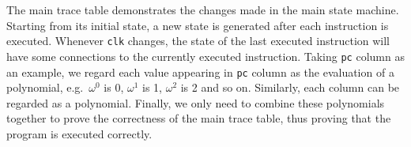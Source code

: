 The main trace table demonstrates the changes made in the main state machine. Starting from its initial state, a new state is generated after each instruction is executed. Whenever \verb|clk| changes, the state of the last executed instruction will have some connections to the currently executed instruction. Taking \verb|pc| column as an example, we regard each value appearing in \verb|pc| column as the evaluation of a polynomial, e.g.\ $\omega^0$ is 0, $\omega^1$ is 1, $\omega^2$ is 2 and so on. Similarly, each column can be regarded as a polynomial. Finally, we only need to combine these polynomials together to prove the correctness of the main trace table, thus proving that the program is executed correctly.
